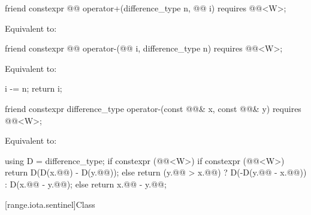 \begin{itemdecl}
friend constexpr @@ operator+(difference_type n, @@ i)
  requires @@<W>;
\end{itemdecl}

\begin{itemdescr}
\pnum
\effects
Equivalent to: 
\end{itemdescr}

\begin{itemdecl}
friend constexpr @@ operator-(@@ i, difference_type n)
  requires @@<W>;
\end{itemdecl}

\begin{itemdescr}
\pnum
\effects
Equivalent to:
\begin{codeblock}
i -= n;
return i;
\end{codeblock}
\end{itemdescr}

\begin{itemdecl}
friend constexpr difference_type operator-(const @@& x, const @@& y)
  requires @@<W>;
\end{itemdecl}

\begin{itemdescr}
\pnum
\effects
Equivalent to:
\begin{codeblock}
using D = difference_type;
if constexpr (@@<W>) {
  if constexpr (@@<W>)
    return D(D(x.@@) - D(y.@@));
  else
    return (y.@@ > x.@@)
      ? D(-D(y.@@ - x.@@))
      : D(x.@@ - y.@@);
} else {
  return x.@@ - y.@@;
}
\end{codeblock}
\end{itemdescr}

[range.iota.sentinel]{Class }

